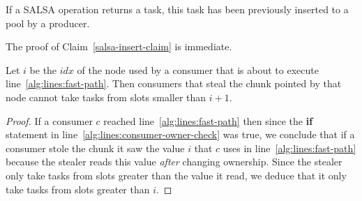 \begin{claim}
\label{salsa-insert-claim}
 If a SALSA operation returns a task, this task has been previously inserted to a pool by a producer.
\end{claim}
\noindent
The proof of Claim~\ref{salsa-insert-claim} is immediate.

\vspace{5pt}\noindent
\begin{lemma}
 \label{lemma:steal-take-bound}
 Let $i$ be the $idx$ of the node used by a consumer that is about to execute line~\ref{alg:lines:fast-path}. Then consumers that steal the chunk pointed by that node cannot take tasks from slots smaller than $i+1$. 
\end{lemma}
\begin{proof}
 If a consumer $c$ reached line~\ref{alg:lines:fast-path} then since the {\bf if} statement in line~\ref{alg:lines:consumer-owner-check} was true, we conclude that if a consumer stole the chunk it saw the value $i$ that $c$ uses in line~\ref{alg:lines:fast-path} because the stealer reads this value \emph{after} changing ownership. Since the stealer only take tasks from slots greater than the value it read, we deduce that it only take tasks from slots greater than $i$.
\end{proof}

